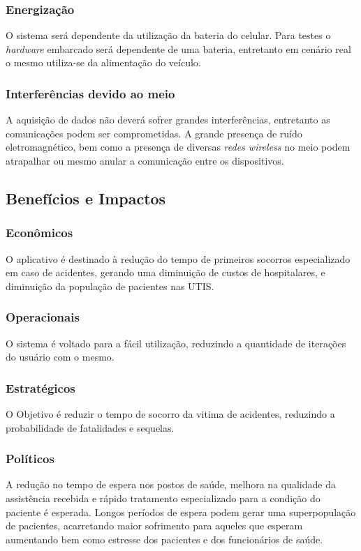 \subsubsection{Energização}

O sistema será dependente da utilização da bateria do celular. Para testes o \textit{hardware} embarcado será dependente de uma bateria, entretanto em cenário real o mesmo utiliza-se da alimentação do veículo.


\subsubsection{Interferências devido ao meio}

A aquisição de dados não deverá sofrer grandes interferências, entretanto as comunicações podem ser comprometidas. A grande presença de ruído eletromagnético, bem como a presença de diversas \textit{redes wireless} no meio podem atrapalhar ou mesmo anular a comunicação entre os dispositivos.

\subsection{\textbf{Benefícios e Impactos}}

\subsubsection{Econômicos}
O aplicativo é destinado à redução do tempo de primeiros socorros especializado em caso de acidentes, gerando uma diminuição de custos de hospitalares, e diminuição da população de pacientes nas UTIS.
\subsubsection{Operacionais}
O sistema é voltado para a fácil utilização, reduzindo a quantidade de iterações do usuário com o mesmo.

\subsubsection{Estratégicos}
O Objetivo é reduzir o tempo de socorro da vitima de acidentes, reduzindo a probabilidade de fatalidades e sequelas.
\subsubsection{Políticos}


A redução no tempo de espera nos postos de saúde, melhora na qualidade da assistência recebida e rápido tratamento especializado para a condição do paciente é esperada. Longos períodos de espera podem gerar uma superpopulação de pacientes, acarretando maior sofrimento para aqueles que esperam aumentando bem como estresse dos pacientes e dos funcionários de saúde.

